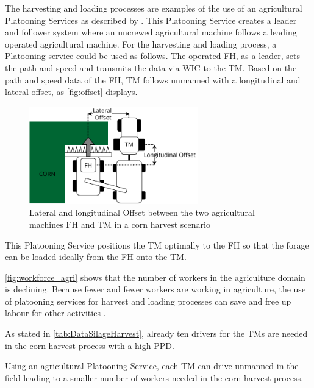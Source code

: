 \documentclass[]{nsm-thesis}
\begin{document}
The harvesting and loading processes are examples of the use of an agricultural Platooning Services as described by 
\textcite{zhang_method_2009}.
This Platooning Service creates a leader and follower system where an uncrewed agricultural machine follows a leading operated agricultural machine.
For the harvesting and loading process, a Platooning service could be used as follows.
The operated \ac{FH}, as a leader, sets the path and speed and transmits the data via \ac{WIC} to the \ac{TM}. Based on the path and speed data of the \ac{FH}, \ac{TM} follows unmanned with a longitudinal and lateral offset, as \autoref{fig:offset} displays.
\begin{figure}%
	\centering
	\includegraphics[width=0.65\textwidth]{figures/offset_platoon.pdf}
	\caption{Lateral and longitudinal Offset between the two agricultural machines \ac{FH} and \ac{TM} in a corn harvest scenario}%
	\label{fig:offset}%
\end{figure}

This Platooning Service positions the \ac{TM} optimally to the \ac{FH} so that the forage can be loaded ideally from the \ac{FH} onto the \ac{TM}.


\autoref{fig:workforce_agri} shows that the number of workers in the agriculture domain is declining.  
Because fewer and fewer workers are working in agriculture, the use of platooning services for harvest and loading processes can save and free up labour for other activities \cite{liu_automation_2022}.

As stated in \autoref{tab:DataSilageHarvest}, already ten drivers for the \ac{TM}s are needed in the corn harvest process with a high \ac{PPD}. 

Using an agricultural Platooning Service, each \ac{TM} can drive unmanned in the field leading to a smaller number of workers needed in the corn harvest process.
\end{document}
